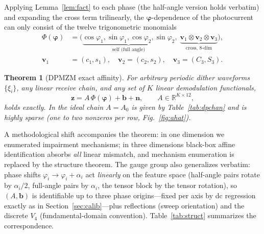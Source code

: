 \documentclass[journal]{IEEEtran}
\newtheorem{theorem}{Theorem}
\newcommand{\zv}{\mathbf{z}}
\newcommand{\bv}{\mathbf{b}}
\newcommand{\nv}{\mathbf{n}}
\newcommand{\vv}{\mathbf{v}}
\newcommand{\phiv}{\bm{\varphi}}
\begin{document}
Applying Lemma~\ref{lem:fact} to each phase (the half-angle version
holds verbatim) and expanding the cross term trilinearly, the
$\phiv$-dependence of the photocurrent can only consist of the twelve
trigonometric monomials
\begin{align}
\Phi(\phiv)&=\bigl(\underbrace{\cos\varphi_1,\sin\varphi_1,
\cos\varphi_2,\sin\varphi_2}_{\text{self (full angle)}},\;
\underbrace{\vv_1{\otimes}\vv_2{\otimes}\vv_3}_{\text{cross, 8-dim}}
\bigr),\nonumber\\
\vv_1&=(c_1,s_1),\quad \vv_2=(c_2,s_2),\quad \vv_3=(C_3,S_3).
\label{eq:feature}
\end{align}

\begin{theorem}[DPMZM exact affinity]
\label{th:dpmzm}
For arbitrary periodic dither waveforms $\{\xi_i\}$, any linear receive
chain, and any set of $K$ linear demodulation functionals,
\begin{equation}
\zv=A\,\Phi(\phiv)+\bv+\nv,\qquad A\in\mathbb{R}^{K\times 12},
\label{eq:dpaffine}
\end{equation}
holds exactly. In the ideal chain $A=A_0$ is given by
Table~\ref{tab:dpchan} and is highly sparse (one to two nonzeros per
row, Fig.~\ref{fig:ahat}).
\end{theorem}

A methodological shift accompanies the theorem: in one dimension we
enumerated impairment mechanisms; in three dimensions black-box affine
identification absorbs \emph{all} linear mismatch, and mechanism
enumeration is replaced by the structure theorem. The gauge group also
generalizes verbatim: phase shifts $\varphi_i\to\varphi_i+\alpha_i$ act
\emph{linearly} on the feature space (half-angle pairs rotate by
$\alpha_i/2$, full-angle pairs by $\alpha_i$, the tensor block by the
tensor rotation), so $(A,\bv)$ is identifiable up to three phase
origins---fixed per axis by dc regression exactly as in
Section~\ref{sec:calib}---plus reflections (sweep orientation) and the
discrete $V_4$ (fundamental-domain convention).
Table~\ref{tab:struct} summarizes the correspondence.
\end{document}
